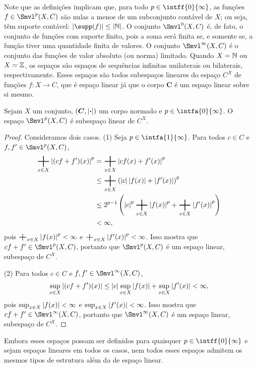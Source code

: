 Note que as definições implicam que, para todo $p \in \intff{0}{\infty}$, as funções $f \in \Smvl^p(X,C)$ são nulas a menos de um subconjunto contável de $X$; ou seja, têm suporte contável: $\card{\supp(f)} \leq \card{\N}$. O conjunto $\Smvl^0(X,C)$ é, de fato, o conjunto de funções com suporte finito, pois a soma será finita se, e somente se, a função tiver uma quantidade finita de valores. O conjunto $\Smvl^\infty(X,C)$ é o conjunto das funções de valor absoluto (ou norma) limitado. Quando $X=\mathbb{N}$ ou $X=\mathbb{Z}$, os espaços são espaços de sequências infinitas unilaterais ou bilaterais, respectivamente. Esses espaços são todos subespaços lineares do espaço $C^X$ de funções $f\colon X \to C$, que é espaço linear já que o corpo $\bm C$ é um espaço linear sobre si mesmo.

\begin{prop}
Sejam $X$ um conjunto, $(\bm C,\left\vert{\bm{\cdot}}\right\vert)$ um corpo normado
 e $p \in \intfa{0}{\infty}$. O espaço $\Smvl^p(X,C)$ é subespaço linear de $C^X$.
\end{prop}
\begin{proof}
Consideramos dois casos. (1) Seja $p \in \intfa{1}{\infty}$. Para todos $c \in C$ e $f,f' \in \Smvl^p(X,C)$,
	\begin{align*}
	\sum_{x \in X} \abs{(cf+f')(x)}^p &= \sum_{x \in X} \abs{cf(x)+f'(x)}^p \\
		&\leq \sum_{x \in X} \left( \abs{c}\abs{f(x)}+ \abs{f'(x)} \right)^p \\
		&\leq 2^{p-1} \left( \abs{c}^p \sum_{x \in X} \abs{f(x)}^p + \sum_{x \in X} \abs{f'(x)}^p \right) \\
		&< \infty,
	\end{align*}
pois $\sum_{x \in X} \abs{f(x)}^p < \infty$ e $\sum_{x \in X} \abs{f'(x)}^p < \infty$. Isso mostra que $cf+f' \in \Smvl^p(X,C)$, portanto que $\Smvl^p(X,C)$ é um espaço linear, subespaço de $C^X$.

(2) Para todos $c \in C$ e $f,f' \in \Smvl^\infty(X,C)$,
	\begin{equation*}
	\sup_{x \in X} \left\vert{(cf+f')(x)}\right\vert \leq \left\vert{c}\right\vert\sup_{x \in X} \left\vert{f(x)}\right\vert + \sup_{x \in X} \left\vert{f'(x)}\right\vert < \infty,
	\end{equation*}
pois $\sup_{x \in X} \left\vert{f(x)}\right\vert < \infty$ e $\sup_{x \in X} \left\vert{f'(x)}\right\vert < \infty$. Isso mostra que $cf+f' \in \Smvl^\infty(X,C)$, portanto que $\Smvl^\infty(X,C)$ é um espaço linear, subespaço de $C^X$.	
\end{proof}

Embora esses espaços possam ser definidos para quaisquer $p \in \intff{0}{\infty}$ e sejam espaços lineares em todos os casos, nem todos esses espaços admitem os mesmos tipos de estrutura além da de espaço linear.

